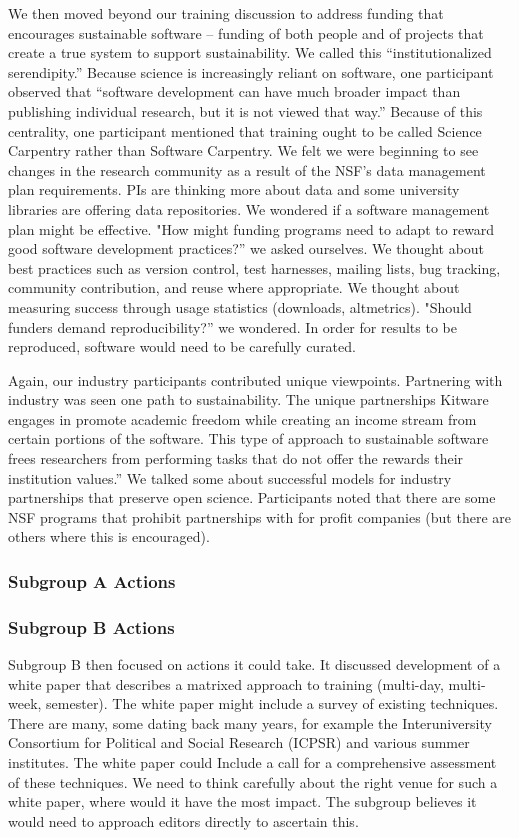 \documentclass[11pt, oneside]{amsart}
\begin{document}
We then moved beyond our training discussion to address funding that
encourages sustainable software -- funding of both people and of projects
that create a true system to support sustainability. We called this
``institutionalized serendipity.'' Because science is increasingly reliant
on software, one participant observed that ``software development can have
much broader impact than publishing individual research, but it is not
viewed that way.'' Because of this centrality, one participant mentioned
that training ought to be called Science Carpentry rather than Software
Carpentry. We felt we were beginning to see changes in the research
community as a result of the NSF's data management plan requirements. PIs
are thinking more about data and some university libraries are offering
data repositories. We wondered if a software management plan might be
effective. "How might funding programs need to adapt to reward good
software development practices?'' we asked ourselves. We thought about
best practices such as version control, test harnesses, mailing lists, bug
tracking, community contribution, and reuse where appropriate. We thought
about measuring success through usage statistics (downloads, altmetrics).
"Should funders demand reproducibility?'' we wondered. In order for results
to be reproduced, software would need to be carefully curated.

Again, our industry participants contributed unique viewpoints. Partnering
with industry was seen one path to sustainability. The unique partnerships
Kitware engages in promote academic freedom while creating an income
stream from certain portions of the software. This type of approach to
sustainable software frees researchers from performing tasks that do not
offer the rewards their institution values.'' We talked some about
successful models for industry partnerships that preserve open science.
Participants noted that there are some NSF programs that prohibit
partnerships with for profit companies (but there are others where this is
encouraged).


\subsubsection{Subgroup A Actions}

\subsubsection{Subgroup B Actions}

Subgroup B then focused on actions it could take. It discussed development
of a white paper that describes a matrixed approach to training
(multi-day, multi-week, semester). The white paper might include a survey
of existing techniques. There are many, some dating back many years, for
example the Interuniversity Consortium for Political and Social Research
(ICPSR) and various summer institutes. The white paper could Include a
call for a comprehensive assessment of these techniques. We need to think
carefully about the right venue for such a white paper, where would it
have the most impact. The subgroup believes it would need to approach editors
directly to ascertain this.
\end{document}
